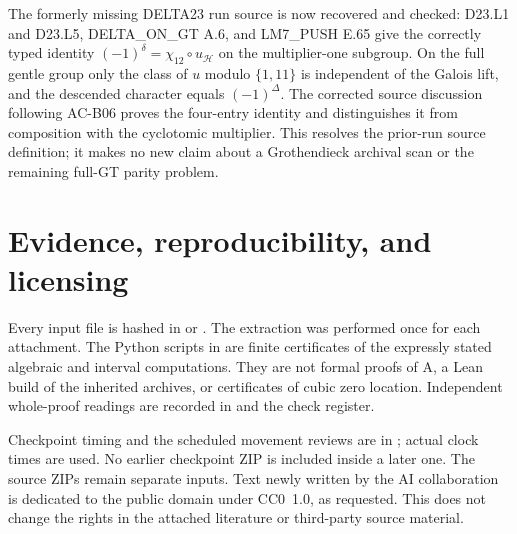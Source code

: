 \documentclass[11pt,a4paper]{article}
\theoremstyle{definition}
\theoremstyle{remark}
\begin{document}
The formerly missing DELTA23 run source is now recovered and
checked: D23.L1 and D23.L5, DELTA\_ON\_GT A.6, and
LM7\_PUSH E.65 give the correctly typed identity
$(-1)^\delta=\chi_{12}\circ u_{\mathcal H}$ on the
multiplier-one subgroup. On the full gentle group only the
class of $u$ modulo $\{1,11\}$ is independent of the
Galois lift, and the descended character equals $(-1)^\Delta$.
The corrected source discussion following AC-B06 proves the
four-entry identity and distinguishes it from composition with
the cyclotomic multiplier. This resolves the prior-run source
definition; it makes no new claim about a Grothendieck archival
scan or the remaining full-GT parity problem.

\appendix
\section{Evidence, reproducibility, and licensing}
Every input file is hashed in
 or
.
The extraction was performed once for each attachment.
The Python scripts in  are finite
certificates of the expressly stated algebraic and
interval computations. They are not formal proofs
of A, a Lean build of the inherited archives, or
certificates of cubic zero location. Independent
whole-proof readings are recorded in 
and the check register.

Checkpoint timing and the scheduled movement reviews
are in ; actual clock times are used.
No earlier checkpoint ZIP is included inside a later
one. The source ZIPs remain separate inputs.
Text newly written by the AI collaboration is
dedicated to the public domain under CC0~1.0, as
requested. This does not change the rights in the
attached literature or third-party source material.
\end{document}
